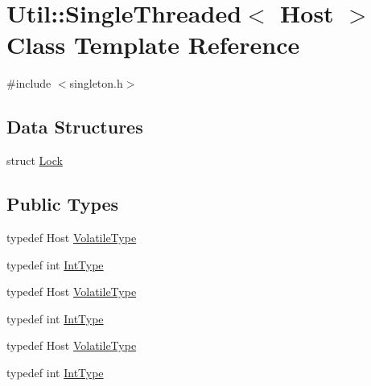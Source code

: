 \hypertarget{classUtil_1_1SingleThreaded}{}\section{Util\+:\+:Single\+Threaded$<$ Host $>$ Class Template Reference}
\label{classUtil_1_1SingleThreaded}


{\ttfamily \#include $<$singleton.\+h$>$}

\subsection*{Data Structures}
\begin{DoxyCompactItemize}
\item 
struct \mbox{\hyperlink{structUtil_1_1SingleThreaded_1_1Lock}{Lock}}
\end{DoxyCompactItemize}
\subsection*{Public Types}
\begin{DoxyCompactItemize}
\item 
typedef Host \mbox{\hyperlink{classUtil_1_1SingleThreaded_a2181651ae6fb27288205435da7c5df22}{Volatile\+Type}}
\item 
typedef int \mbox{\hyperlink{classUtil_1_1SingleThreaded_a35932213fb0c15a7b67ced79bc2af4c6}{Int\+Type}}
\item 
typedef Host \mbox{\hyperlink{classUtil_1_1SingleThreaded_a2181651ae6fb27288205435da7c5df22}{Volatile\+Type}}
\item 
typedef int \mbox{\hyperlink{classUtil_1_1SingleThreaded_a35932213fb0c15a7b67ced79bc2af4c6}{Int\+Type}}
\item 
typedef Host \mbox{\hyperlink{classUtil_1_1SingleThreaded_a2181651ae6fb27288205435da7c5df22}{Volatile\+Type}}
\item 
typedef int \mbox{\hyperlink{classUtil_1_1SingleThreaded_a35932213fb0c15a7b67ced79bc2af4c6}{Int\+Type}}
\end{DoxyCompactItemize}
